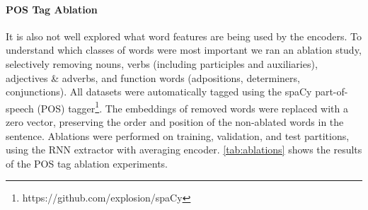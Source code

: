 


\paragraph{POS Tag Ablation}
It is also not well explored what word features are being used by the encoders.
To understand which classes of words were most important we ran an ablation
study, selectively removing nouns, verbs 
(including participles and auxiliaries), adjectives \& adverbs, and 
function words (adpositions, determiners, conjunctions).
All datasets were automatically tagged using
the spaCy part-of-speech (POS)
tagger\footnote{https://github.com/explosion/spaCy}.   
The embeddings of removed words were replaced with a zero vector,
preserving the order and position of the non-ablated words in the sentence.
Ablations were performed on training, validation, and test partitions,
using the RNN extractor with averaging encoder.
\autoref{tab:ablations} shows the results of the POS
tag ablation experiments. 
